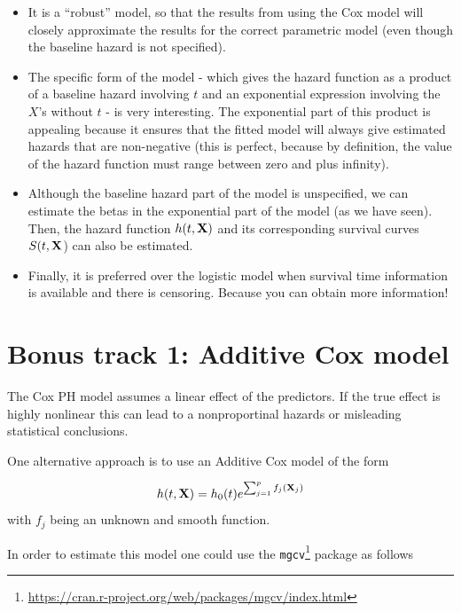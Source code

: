 \documentclass[]{book}
\let\rmarkdownfootnote\footnote%
\def\footnote{\protect\rmarkdownfootnote}
\renewcommand{\href}[2]{#2\footnote{\url{#1}}}
\theoremstyle{definition}
\theoremstyle{definition}
\theoremstyle{definition}
\theoremstyle{remark}
\begin{document}
\begin{itemize}
\item
  It is a ``robust'' model, so that the results from using the Cox model
  will closely approximate the results for the correct parametric model
  (even though the baseline hazard is not specified).
\item
  The specific form of the model - which gives the hazard function as a
  product of a baseline hazard involving \(t\) and an exponential
  expression involving the \(X\)'s without \(t\) - is very interesting.
  The exponential part of this product is appealing because it ensures
  that the fitted model will always give estimated hazards that are
  non-negative (this is perfect, because by definition, the value of the
  hazard function must range between zero and plus infinity).
\item
  Although the baseline hazard part of the model is unspecified, we can
  estimate the betas in the exponential part of the model (as we have
  seen). Then, the hazard function \(h(t,\textbf X)\) and its
  corresponding survival curves \(S(t, \textbf X\)) can also be
  estimated.
\item
  Finally, it is preferred over the logistic model when survival time
  information is available and there is censoring. Because you can
  obtain more information!
\end{itemize}

\section{Bonus track 1: Additive Cox
model}\label{bonus-track-1-additive-cox-model}

The Cox PH model assumes a linear effect of the predictors. If the true
effect is highly nonlinear this can lead to a nonproportinal hazards or
misleading statistical conclusions.

One alternative approach is to use an Additive Cox model
\citep{NoRefworks:5} of the form

\[
h(t, \textbf X) = h_0(t) e^{\sum_{j=1}^p f_j(\textbf X_j)}
\] with \(f_j\) being an unknown and smooth function.

In order to estimate this model one could use the
\href{https://cran.r-project.org/web/packages/mgcv/index.html}{\texttt{mgcv}}
package as follows
\end{document}
